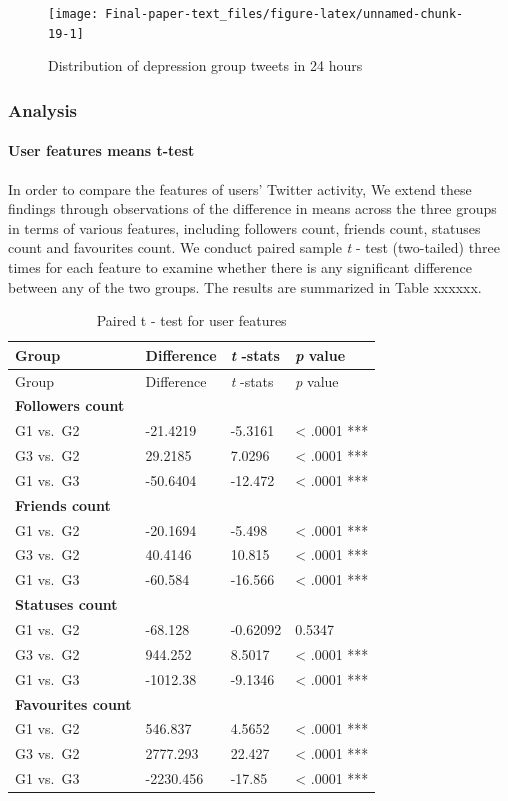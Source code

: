 \documentclass[]{article}
\let\oldparagraph\paragraph
\renewcommand{\paragraph}[1]{\oldparagraph{#1}\mbox{}}
\begin{document}
\begin{figure}

{\centering \texttt{[image: Final-paper-text\_files/figure-latex/unnamed-chunk-19-1]} 

}

\caption{Distribution of depression group tweets in 24 hours}\label{fig:unnamed-chunk-19}
\end{figure}

\hypertarget{analysis}{%
\subsubsection{Analysis}\label{analysis}}

\hypertarget{user-features-means-t-test}{%
\paragraph{User features means
t-test}\label{user-features-means-t-test}}

In order to compare the features of users' Twitter activity, We extend
these findings through observations of the difference in means across
the three groups in terms of various features, including followers
count, friends count, statuses count and favourites count. We conduct
paired sample \emph{t} - test (two-tailed) three times for each feature
to examine whether there is any significant difference between any of
the two groups. The results are summarized in Table xxxxxx.

\begin{longtable}[]{@{}llll@{}}
\caption{Paired t - test for user features}\tabularnewline
\toprule
Group & Difference & \emph{t} -stats & \emph{p} value\tabularnewline
\midrule
\endfirsthead
\toprule
Group & Difference & \emph{t} -stats & \emph{p} value\tabularnewline
\midrule
\endhead
\textbf{Followers count} & & &\tabularnewline
G1 vs.~G2 & -21.4219 & -5.3161 & \textless{} .0001 ***\tabularnewline
G3 vs.~G2 & 29.2185 & 7.0296 & \textless{} .0001 ***\tabularnewline
G1 vs.~G3 & -50.6404 & -12.472 & \textless{} .0001 ***\tabularnewline
\textbf{Friends count} & & &\tabularnewline
G1 vs.~G2 & -20.1694 & -5.498 & \textless{} .0001 ***\tabularnewline
G3 vs.~G2 & 40.4146 & 10.815 & \textless{} .0001 ***\tabularnewline
G1 vs.~G3 & -60.584 & -16.566 & \textless{} .0001 ***\tabularnewline
\textbf{Statuses count} & & &\tabularnewline
G1 vs.~G2 & -68.128 & -0.62092 & 0.5347\tabularnewline
G3 vs.~G2 & 944.252 & 8.5017 & \textless{} .0001 ***\tabularnewline
G1 vs.~G3 & -1012.38 & -9.1346 & \textless{} .0001 ***\tabularnewline
\textbf{Favourites count} & & &\tabularnewline
G1 vs.~G2 & 546.837 & 4.5652 & \textless{} .0001 ***\tabularnewline
G3 vs.~G2 & 2777.293 & 22.427 & \textless{} .0001 ***\tabularnewline
G1 vs.~G3 & -2230.456 & -17.85 & \textless{} .0001 ***\tabularnewline
\bottomrule
\end{longtable}
\end{document}
